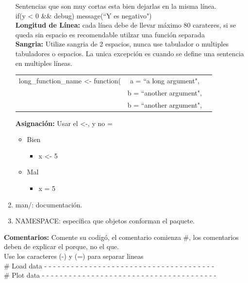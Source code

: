 \begin{enumerate}
Sentencias que son muy cortas esta bien dejarlas en la misma l\'inea.\\
if(y \textless \hspace{1mm} 0 \&\& debug) message(``Y es negativo")\\

\textbf{Longitud de L\'inea:} cada l\'inea debe de llevar m\'aximo 80 carateres, si se queda sin espacio es recomendable utilzar una funci\'on separada\\

\textbf{Sangria:} Utilize sangria de 2 espacios, nunca use tabulador o multiples tabuladores o espacios. La unica excepci\'on es cuando se define una sentencia en multiples l\'ineas.\\
\begin{tabular}{ccc}
long\_function\_name \textless- function(& a = ``a long argument", \\ 
 &  b = ``another argument", \\
 &  b = ``another argument", \\
\end{tabular}
\newline

\textbf{Asignaci\'on:} Usar el \textless-, y no =
\begin{itemize}
\item Bien  
\begin{itemize}
     \item x \textless- 5
  \end{itemize}
\item Mal
   \begin{itemize}
      \item x = 5
   \end{itemize}
 \end{itemize}

  \item man/: documentación.\\
  \item NAMESPACE: específica que objetos conforman el paquete.\\
\end{enumerate}
\textbf{Comentarios:} Comente su codig\'o, el comentario comienza \#, los comentarios deben de explicar el porque, no el que.\\ Use los caracteres (-) y (=) para separar lineas\\
{\# Load data - - - - - - - - - - - - - - - - - - - - - - - - - - - - - - - - - - - - - -}\\
{\# Plot data - - - - - - - - - - - - - - - - - - - - - - - - - - - - - - - - - - - - - - -}\\


